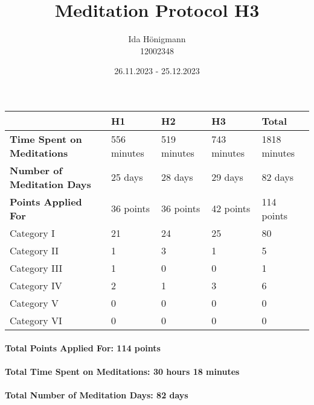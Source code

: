 \documentclass[11pt,a4paper]{article}
\begin{document}
\afterpage{\restorepagecolor}
\title{\LARGE\bfseries Meditation Protocol H3}
\author{Ida Hönigmann \\ 12002348}
\date{26.11.2023 - 25.12.2023}
\maketitle

\begin{tabular}{l|l|l|l|l}
	                                   & \textbf{H1} & \textbf{H2} & \textbf{H3} & \textbf{Total}\\
	\hline
	\textbf{Time Spent on Meditations} & 556 minutes & 519 minutes & 743 minutes & 1818 minutes  \\
	\textbf{Number of Meditation Days} & 25 days     & 28 days     & 29 days     & 82 days       \\
	\textbf{Points Applied For}        & 36 points   & 36 points   & 42 points   & 114 points    \\
	\hline
	Category I                         & 21          & 24          & 25          & 80            \\
	Category II                        & 1           & 3           & 1           & 5             \\
	Category III                       & 1           & 0           & 0           & 1             \\
	Category IV                        & 2           & 1           & 3           & 6             \\
	Category V                         & 0           & 0           & 0           & 0             \\
	Category VI                        & 0           & 0           & 0           & 0             \\
\end{tabular}

\paragraph{Total Points Applied For: 114 points}
\paragraph{Total Time Spent on Meditations: 30 hours 18 minutes}
\paragraph{Total Number of Meditation Days: 82 days}
\end{document}
